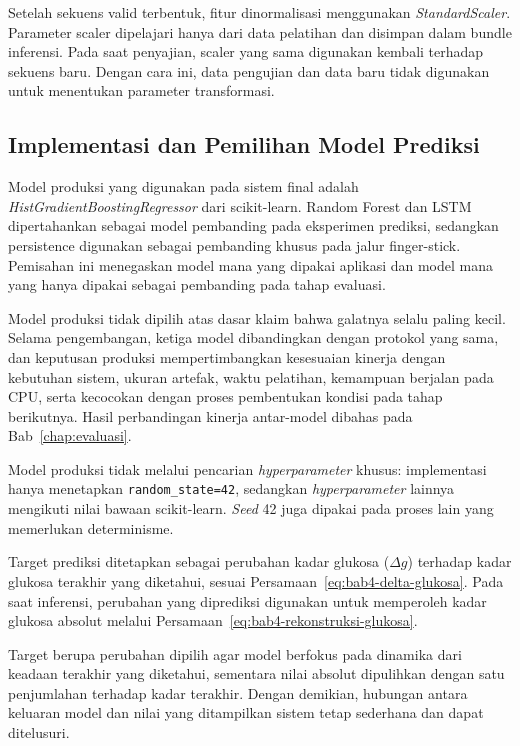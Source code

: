 Setelah sekuens valid terbentuk, fitur dinormalisasi menggunakan \textit{StandardScaler}. Parameter scaler dipelajari hanya dari data pelatihan dan disimpan dalam
bundle inferensi. Pada saat penyajian, scaler yang sama digunakan kembali terhadap sekuens baru. Dengan cara ini, data pengujian dan data baru tidak digunakan untuk
menentukan parameter transformasi.

\subsection{Implementasi dan Pemilihan Model Prediksi}
\label{subsec:bab5-model-prediksi}

Model produksi yang digunakan pada sistem final adalah \textit{HistGradientBoostingRegressor} dari scikit-learn. Random Forest dan LSTM dipertahankan sebagai model
pembanding pada eksperimen prediksi, sedangkan persistence digunakan sebagai pembanding khusus pada jalur finger-stick. Pemisahan ini menegaskan model mana yang dipakai aplikasi dan model mana yang hanya dipakai sebagai pembanding pada tahap evaluasi.

Model produksi tidak dipilih atas dasar klaim bahwa galatnya selalu paling kecil. Selama pengembangan, ketiga model dibandingkan dengan protokol yang sama, dan
keputusan produksi mempertimbangkan kesesuaian kinerja dengan kebutuhan sistem, ukuran artefak, waktu pelatihan, kemampuan berjalan pada CPU, serta kecocokan dengan
proses pembentukan kondisi pada tahap berikutnya. Hasil perbandingan kinerja antar-model dibahas pada Bab~\ref{chap:evaluasi}.

Model produksi tidak melalui pencarian \textit{hyperparameter} khusus: implementasi hanya menetapkan \texttt{random\_state=42}, sedangkan \textit{hyperparameter}
lainnya mengikuti nilai bawaan scikit-learn. \textit{Seed} 42 juga dipakai pada proses lain yang memerlukan determinisme.

Target prediksi ditetapkan sebagai perubahan kadar glukosa ($\Delta g$) terhadap kadar glukosa terakhir yang diketahui, sesuai Persamaan~\ref{eq:bab4-delta-glukosa}.
Pada saat inferensi, perubahan yang diprediksi digunakan untuk memperoleh kadar glukosa absolut melalui Persamaan~\ref{eq:bab4-rekonstruksi-glukosa}.

Target berupa perubahan dipilih agar model berfokus pada dinamika dari keadaan terakhir yang diketahui, sementara nilai absolut dipulihkan dengan satu penjumlahan
terhadap kadar terakhir. Dengan demikian, hubungan antara keluaran model dan nilai yang ditampilkan sistem tetap sederhana dan dapat ditelusuri.

